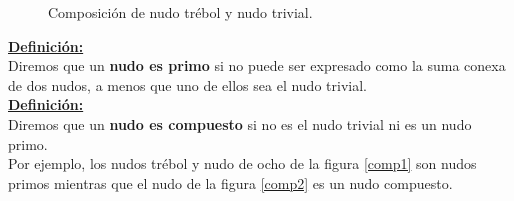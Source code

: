 \documentclass[14pt]{extarticle}
\begin{document}
      \begin{figure}[h!]
      	\centering
      	\caption{Composición de nudo trébol y nudo trivial.}
      	\label{comp4} 
      \end{figure}
  
 \underline{\textbf{ Definición:}}\\
 Diremos que un \textbf{nudo es primo} si no puede ser expresado como la suma conexa de dos nudos, a menos que uno de ellos sea el nudo trivial. \\
 
\underline{ \textbf{ Definición:}}\\
 Diremos que un \textbf{nudo es compuesto} si no es el nudo trivial ni es un nudo primo.\\
  
  Por ejemplo, los nudos trébol y nudo de ocho de la figura \ref{comp1} son nudos primos mientras que el nudo de la figura \ref{comp2} es un nudo compuesto. \\ 
  
\end{document}
